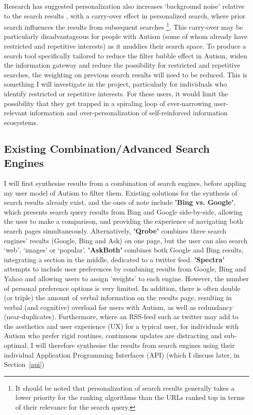 \documentclass[a4paper, 10pt]{article}
\begin{document}
Research has suggested personalization also increases ‘background noise’ relative to the search results \cite{briggs}, with a carry-over effect in personalized search, where prior search influences the results from subsequent searches \footnote{It should be noted that personalization of search results generally takes a lower priority for the ranking algorithms than the URLs ranked top in terms of their relevance for the search query.}. This carry-over may be particularly disadvantageous for people with Autism (some of whom already have restricted and repetitive interests) as it muddies their search space. To produce a search tool specifically tailored to reduce the filter bubble effect in Autism, widen the information gateway and reduce the possibility for restricted and repetitive searches, the weighting on previous search results will need to be reduced. This is something I will investigate in the project, particularly for individuals who identify restricted or repetitive interests. For these users, it would limit the possibility that they get trapped in a spiraling loop of ever-narrowing user-relevant information and over-personalization of self-reinforced information ecosystems.


\subsection{Existing Combination/Advanced Search Engines}\label{Existing Combination/Advanced Search Engines}
I will first synthesise results from a combination of search engines, before appling my user model of Autism to filter them. Existing solutions for the synthesis of search results already exist, and the ones of note include \textbf{'Bing vs. Google'}, which presents search query results from Bing and Google side-by-side, allowing the user to make a comparison, and providing the experience of navigating both search pages simultaneously. Alternatively, \textbf{'Qrobe'} combines three search engines’ results (Google, Bing and Ask) on one page, but the user can also search ‘web’, ‘images’ or ‘popular’. \textbf{'AskBoth'} combines both Google and Bing results, integrating a section in the middle, dedicated to a twitter feed. \textbf{'Spectra'} attempts to include user preferences by combining results from Google, Bing and Yahoo and allowing users to assign 'weights' to each engine. However, the number of personal preference options is very limited. In addition, there is often double (or triple) the amount of verbal information on the results page, resulting in verbal (and cognitive) overload for users with Autism, as well as redundancy (near-duplicates). Furthermore, where an RSS-feed such as twitter may add to the aesthetics and user experience (UX) for a typical user, for individuals with Autism who prefer rigid routines, continuous updates are distracting and sub-optimal. I will therefore synthesise the results from search engines using their individual Application Programming Interfaces (API) (which I discuss later, in Section~\ref{api})
\end{document}
